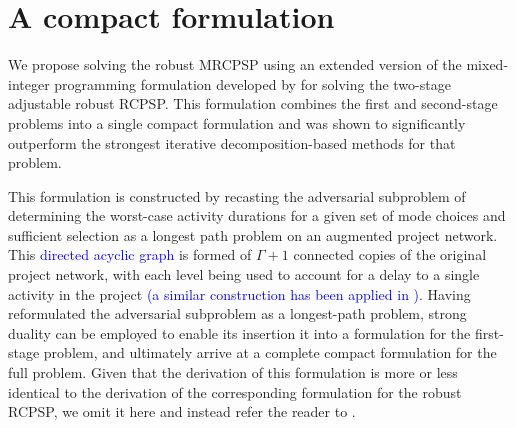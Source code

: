 \documentclass[a4paper,abstracton]{scrartcl}
\newcommand{\marc}[1]{\textcolor{blue}{#1}}
\begin{document}
\section{A compact formulation}\label{section:compact_formulation}

We propose solving the robust MRCPSP using an extended version of the mixed-integer programming formulation developed by \cite{bold2021compact} for solving the two-stage adjustable robust RCPSP. This formulation combines the first and second-stage problems into a single compact formulation and was shown to significantly outperform the strongest iterative decomposition-based methods for that problem.

This formulation is constructed by recasting the adversarial subproblem of determining the worst-case activity durations for a given set of mode choices and sufficient selection as a longest path problem on an augmented project network. This 
\marc{directed acyclic graph}
is formed of $\Gamma+1$ connected copies of the original project network, with each level being used to account for a delay to a single activity in the project \marc{(a similar construction has been applied in \cite{bendotti2019anchor})}. Having reformulated the adversarial subproblem as a longest-path problem, strong duality can be employed to enable its insertion it into a formulation for the first-stage problem, and ultimately arrive at a complete compact formulation for the full problem. Given that the derivation of this formulation is more or less identical to the derivation of the corresponding formulation for the robust RCPSP, we omit it here and instead refer the reader to \cite{bold2021compact}.
\end{document}
